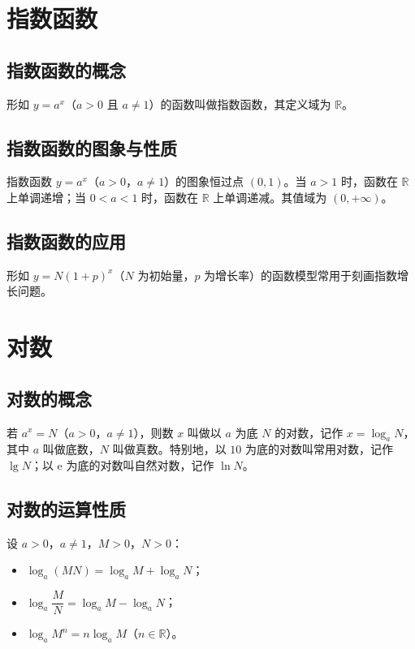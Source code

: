 \documentclass[lang=cn,newtx,10pt,scheme=chinese,nofont]{elegantbook}
\begin{document}
\section{指数函数}
\subsection{指数函数的概念}
\begin{definition}[指数函数]
形如 $y=a^x$（$a>0$ 且 $a \neq 1$）的函数叫做指数函数，其定义域为 $\mathbb{R}$。
\end{definition}
\subsection{指数函数的图象与性质}
\begin{definition}[指数函数的性质]
指数函数 $y=a^x$（$a>0$，$a \neq 1$）的图象恒过点 $(0,1)$。当 $a>1$ 时，函数在 $\mathbb{R}$ 上单调递增；当 $0<a<1$ 时，函数在 $\mathbb{R}$ 上单调递减。其值域为 $(0,+\infty)$。
\end{definition}
\subsection{指数函数的应用}
\begin{definition}[指数增长模型]
形如 $y=N(1+p)^x$（$N$ 为初始量，$p$ 为增长率）的函数模型常用于刻画指数增长问题。
\end{definition}

\section{对数}
\subsection{对数的概念}
\begin{definition}[对数]
若 $a^x=N$（$a>0$，$a \neq 1$），则数 $x$ 叫做以 $a$ 为底 $N$ 的对数，记作 $x=\log_a N$，其中 $a$ 叫做底数，$N$ 叫做真数。特别地，以 $10$ 为底的对数叫常用对数，记作 $\lg N$；以 $\mathrm{e}$ 为底的对数叫自然对数，记作 $\ln N$。
\end{definition}
\subsection{对数的运算性质}
\begin{definition}[对数的运算性质]
设 $a>0$，$a \neq 1$，$M>0$，$N>0$：
\begin{itemize}
    \item $\log_a(MN)=\log_a M+\log_a N$；
    \item $\log_a \dfrac{M}{N}=\log_a M-\log_a N$；
    \item $\log_a M^n=n\log_a M$（$n \in \mathbb{R}$）。
\end{itemize}
\end{definition}
\end{document}
